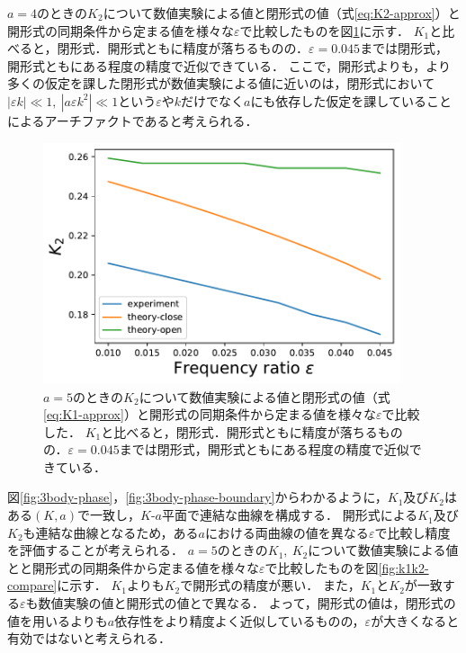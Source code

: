 \documentclass[../main]{subfiles}
\begin{document}
$a=4$のときの$K_2$について数値実験による値と閉形式の値（式\eqref{eq:K2-approx}）と開形式の同期条件から定まる値を様々な$\varepsilon$で比較したものを図\ref{fig:k2-compare}に示す．
$K_1$と比べると，閉形式．開形式ともに精度が落ちるものの．$\varepsilon=0.045$までは閉形式，開形式ともにある程度の精度で近似できている．
ここで，開形式よりも，より多くの仮定を課した閉形式が数値実験による値に近いのは，閉形式において$|\varepsilon k|\ll 1,\ |a\varepsilon k^2| \ll 1$という$\varepsilon$や$k$だけでなく$a$にも依存した仮定を課していることによるアーチファクトであると考えられる．

\begin{figure}[tbp]
\centering
\includegraphics[width=105mm]{./images/k2-compare.pdf}
\centering
\caption{$a=5$のときの$K_2$について数値実験による値と閉形式の値（式\eqref{eq:K1-approx}）と開形式の同期条件から定まる値を様々な$\varepsilon$で比較した．
$K_1$と比べると，閉形式．開形式ともに精度が落ちるものの．$\varepsilon=0.045$までは閉形式，開形式ともにある程度の精度で近似できている．}
\label{fig:k2-compare}
\end{figure}

図\ref{fig:3body-phase}，\ref{fig:3body-phase-boundary}からわかるように，$K_1$及び$K_2$はある$(K,a)$で一致し，$K$-$a$平面で連結な曲線を構成する．
開形式による$K_1$及び$K_2$も連結な曲線となるため，ある$a$における両曲線の値を異なる$\varepsilon$で比較し精度を評価することが考えられる．
$a=5$のときの$K_1,\ K_2$について数値実験による値とと開形式の同期条件から定まる値を様々な$\varepsilon$で比較したものを図\ref{fig:k1k2-compare}に示す．
$K_1$よりも$K_2$で開形式の精度が悪い．
また，$K_1$と$K_2$が一致する$\varepsilon$も数値実験の値と開形式の値とで異なる．
よって，開形式の値は，閉形式の値を用いるよりも$a$依存性をより精度よく近似しているものの，$\varepsilon$が大きくなると有効ではないと考えられる．
\end{document}
